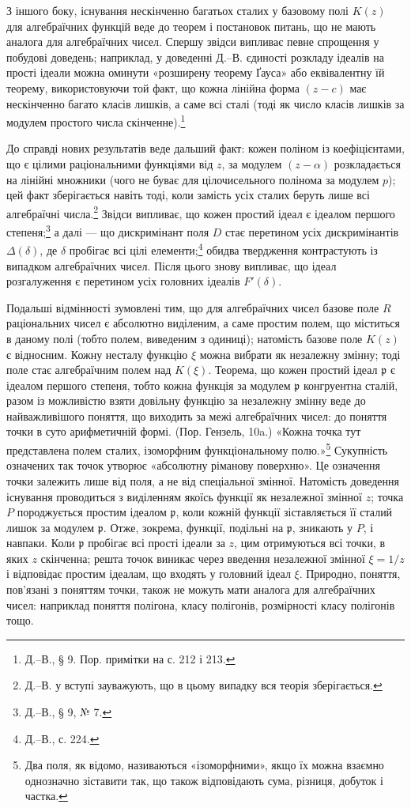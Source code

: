 \documentclass[11pt]{article}
\providecommand{\frp}{\mathfrak p}
\begin{document}
З іншого боку, існування нескінченно багатьох сталих у базовому полі \(K(z)\) для алгебраїчних функцій веде до теорем і постановок питань, що не мають аналога для алгебраїчних чисел. Спершу звідси випливає певне спрощення у побудові доведень; наприклад, у доведенні Д.--В. єдиності розкладу ідеалів на прості ідеали можна оминути «розширену теорему Ґауса» або еквівалентну їй теорему, використовуючи той факт, що кожна лінійна форма \((z-c)\) має нескінченно багато класів лишків, а саме всі сталі (тоді як число класів лишків за модулем простого числа скінченне).\footnote{Д.--В., § 9. Пор. примітки на с. 212 і 213.}

До справді нових результатів веде дальший факт: кожен поліном із коефіцієнтами, що є цілими раціональними функціями від \(z\), за модулем \((z-\alpha)\) розкладається на лінійні множники (чого не буває для цілочисельного полінома за модулем \(p\)); цей факт зберігається навіть тоді, коли замість усіх сталих беруть лише всі алгебраїчні числа.\footnote{Д.--В. у вступі зауважують, що в цьому випадку вся теорія зберігається.} Звідси випливає, що кожен простий ідеал є ідеалом першого степеня;\footnote{Д.--В., § 9, № 7.} а далі --- що дискримінант поля \(D\) стає перетином усіх дискримінантів \(\Delta(\delta)\), де \(\delta\) пробігає всі цілі елементи;\footnote{Д.--В., с. 224.} обидва твердження контрастують із випадком алгебраїчних чисел. Після цього знову випливає, що ідеал розгалуження є перетином усіх головних ідеалів \(F'(\delta)\).

Подальші відмінності зумовлені тим, що для алгебраїчних чисел базове поле \(R\) раціональних чисел є абсолютно виділеним, а саме простим полем, що міститься в даному полі (тобто полем, виведеним з одиниці); натомість базове поле \(K(z)\) є відносним. Кожну несталу функцію \(\xi\) можна вибрати як незалежну змінну; тоді поле стає алгебраїчним полем над \(K(\xi)\). Теорема, що кожен простий ідеал \(\frp\) є ідеалом першого степеня, тобто кожна функція за модулем \(\frp\) конгруентна сталій, разом із можливістю взяти довільну функцію за незалежну змінну веде до найважливішого поняття, що виходить за межі алгебраїчних чисел: до поняття точки в суто арифметичній формі. (Пор. Гензель, 10a.) «Кожна точка тут представлена полем сталих, ізоморфним функціональному полю.»\footnote{Два поля, як відомо, називаються «ізоморфними», якщо їх можна взаємно однозначно зіставити так, що також відповідають сума, різниця, добуток і частка.} Сукупність означених так точок утворює «абсолютну ріманову поверхню». Це означення точки залежить лише від поля, а не від спеціальної змінної. Натомість доведення існування проводиться з виділенням якоїсь функції як незалежної змінної \(z\); точка \(P\) породжується простим ідеалом \(\frp\), коли кожній функції зіставляється її сталий лишок за модулем \(\frp\). Отже, зокрема, функції, подільні на \(\frp\), зникають у \(P\), і навпаки. Коли \(\frp\) пробігає всі прості ідеали за \(z\), цим отримуються всі точки, в яких \(z\) скінченна; решта точок виникає через введення незалежної змінної \(\xi=1/z\) і відповідає простим ідеалам, що входять у головний ідеал \(\xi\). Природно, поняття, пов'язані з поняттям точки, також не можуть мати аналога для алгебраїчних чисел: наприклад поняття полігона, класу полігонів, розмірності класу полігонів тощо.
\end{document}
